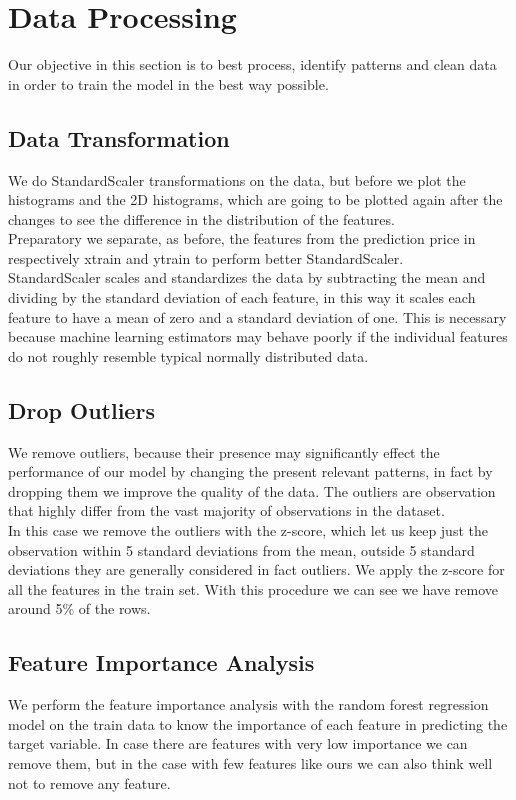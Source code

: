 \documentclass[10pt, notitlepage]{article}
\begin{document}
\color{blue}
\section{Data Processing}
\color{black}
Our objective in this section is to best process, identify patterns and clean data in order to train the model in the best way possible. 

\color{blue}
\subsection{Data Transformation}
\color{black}
We do StandardScaler transformations on the data, but before we plot the histograms and the 2D histograms, which are going to be plotted again after the changes to see the difference in the distribution of the features. 
\\
Preparatory we separate, as before, the features from the prediction price in respectively x\textunderscore train and y\textunderscore train to perform better StandardScaler. 
\\
StandardScaler scales and standardizes the data by subtracting the mean and dividing by the standard deviation of each feature, in this way it scales each feature to have a mean of zero and a standard deviation of one. This is necessary because machine learning estimators may behave poorly if the individual features do not roughly resemble typical normally distributed data.

\color{blue}
\subsection{Drop Outliers}
\color{black}
We remove outliers, because their presence may significantly effect the performance of our model by changing the present relevant patterns, in fact by dropping them we improve the quality of the data. The outliers are observation that highly differ from the vast majority of observations in the dataset.
\\
In this case we remove the outliers with the z-score, which let us keep just the observation within 5 standard deviations from the mean, outside 5 standard deviations they are generally considered in fact outliers. We apply the z-score for all the features in the train set. With this procedure we can see we have remove around 5\% of the rows. 

\color{blue}
\subsection{Feature Importance Analysis}
\color{black}
We perform the feature importance analysis with the random forest regression model on the train data to know the importance of each feature in predicting the target variable. In case there are features with very low importance we can remove them, but in the case with few features like ours we can also think well not to remove any feature.
\end{document}
